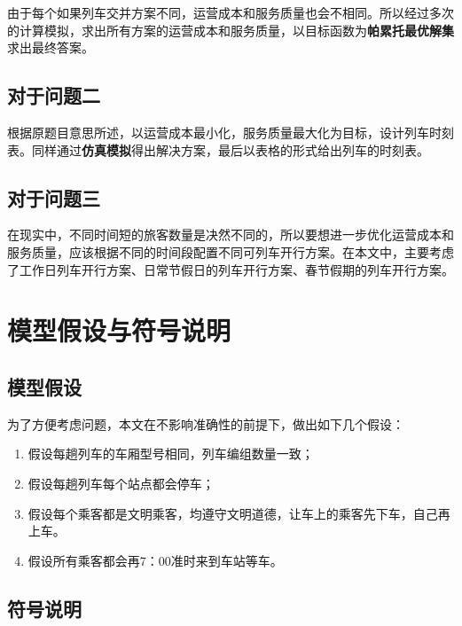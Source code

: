 由于每个如果列车交并方案不同，运营成本和服务质量也会不相同。所以经过多次的计算模拟，求出所有方案的运营成本和服务质量，以目标函数为\textbf{帕累托最优解集}求出最终答案。

\subsection{对于问题二}

根据原题目意思所述，以运营成本最小化，服务质量最大化为目标，设计列车时刻表。同样通过\textbf{仿真模拟}得出解决方案，最后以表格的形式给出列车的时刻表。

\subsection{对于问题三}

在现实中，不同时间短的旅客数量是决然不同的，所以要想进一步优化运营成本和服务质量，应该根据不同的时间段配置不同可列车开行方案。在本文中，主要考虑了工作日列车开行方案、日常节假日的列车开行方案、春节假期的列车开行方案。


%
%

\section{模型假设与符号说明}

\subsection{模型假设}

为了方便考虑问题，本文在不影响准确性的前提下，做出如下几个假设：

\begin{enumerate}
    \item 假设每趟列车的车厢型号相同，列车编组数量一致；
    \item 假设每趟列车每个站点都会停车；
    \item 假设每个乘客都是文明乘客，均遵守文明道德，让车上的乘客先下车，自己再上车。
    \item 假设所有乘客都会再7：00准时来到车站等车。
\end{enumerate}

\subsection{符号说明}

